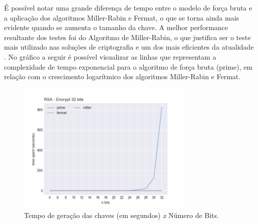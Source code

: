 É possível notar uma grande diferença de tempo entre o modelo de força bruta e a aplicação dos algoritmos Miller-Rabin e Fermat, o que se torna ainda mais evidente quando se aumenta o tamanho da chave. A melhor performance resultante dos testes foi do Algoritmo de Miller-Rabin, o que justifica ser o teste mais utilizado nas soluções de criptografia e um dos mais eficientes da atualidade \cite{ribeiro:2014}. No gráfico a seguir é possível visualizar as linhas que representam a complexidade de tempo exponencial para o algoritmo de força bruta (prime), em relação com o crescimento logarítmico dos algoritmos Miller-Rabin e Fermat. %

\begin{figure}[!htbp]
\centering
\includegraphics[width=0.75\textwidth]{images/32_Encrypt.png}
\caption{Tempo de geração das chaves (em segundos) \textit{x} Número de Bits.}
\label{fig:encryptFig}
\end{figure}
